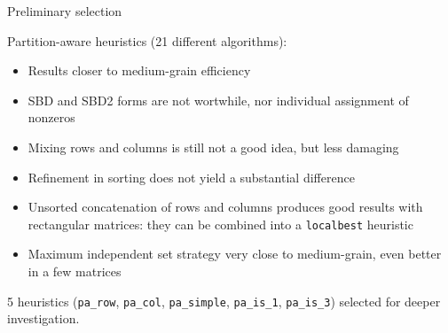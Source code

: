 \begin{frame}{Preliminary selection}

	Partition-aware heuristics (21 different algorithms):

	\begin{itemize}
		\item Results closer to medium-grain efficiency
		\item SBD and SBD2 forms are not wortwhile, nor individual assignment of nonzeros
		\item Mixing rows and columns is still not a good idea, but less damaging
		\item Refinement in sorting does not yield a substantial difference
		\item Unsorted concatenation of rows and columns produces good results with rectangular matrices: they can be combined into a \texttt{localbest} heuristic
		\item Maximum independent set strategy very close to medium-grain, even better in a few matrices
	\end{itemize}

	5 heuristics (\texttt{pa\_row}, \texttt{pa\_col}, \texttt{pa\_simple}, \texttt{pa\_is\_1}, \texttt{pa\_is\_3}) selected for deeper investigation.

\end{frame}

